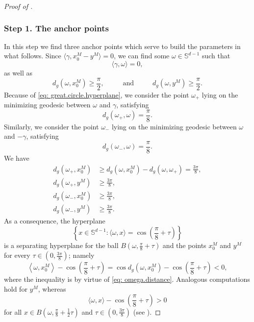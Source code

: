 \documentclass[a4paper,11pt]{article}
\theoremstyle{plain}
\renewcommand{\S}{\mathbb{S}^{d-1}}
\renewcommand{\geq}{\geqslant}
\numberwithin{equation}{section}
\begin{document}
\begin{proof}[Proof of ]
\subsubsection*{Step 1. The anchor points}
In this step we find three anchor points which serve to build the parameters in what follows. 
Since $\langle \gamma, x_0^M-y^M\rangle=0$, we can find some $\omega\in\S$ such that 
\begin{equation}\label{eq: great.circle.hyperplane}
\langle \gamma, \omega\rangle=0,
\end{equation}
as well as
\begin{equation}\label{eq: omega.distance}
d_g\left(\omega, x_0^M\right)\geq \frac{\pi}{2},\hspace{1cm}\text{ and } \hspace{1cm}  d_g\left(\omega, y^M\right)\geq\frac{\pi}{2}.
\end{equation}
Because of \eqref{eq: great.circle.hyperplane}, we consider the point $\omega_+$ lying on the minimizing geodesic between $\omega$ and $\gamma$, satisfying
\begin{equation*}
d_g(\omega_+,\omega)=\frac{\pi}{8}.
\end{equation*}
Similarly, we consider the point $\omega_-$ lying on the minimizing geodesic between $\omega$ and $-\gamma$, satisfying 
\begin{equation*}
d_g(\omega_-,\omega)=\frac{\pi}{8}.
\end{equation*}
We have 
\begin{align*}
d_g\left(\omega_+,x_0^M\right)&\geq d_g\left(\omega,x_0^M\right)-d_g\left(\omega,\omega_+\right)=\frac{3\pi}{8},\\
d_g\left(\omega_+,y^M\right)&\geq \frac{3\pi}{8},\\ 
d_g\left(\omega_-,x_0^M\right)&\geq \frac{3\pi}{8},\\
d_g\left(\omega_-,y^M\right)&\geq \frac{3\pi}{8}.
\end{align*}
As a consequence, the hyperplane 
\begin{equation*}
\left\{x\in\S\colon\langle\omega,x\rangle=\cos\left(\frac{\pi}{8}+\tau\right)\right\}
\end{equation*}
is a separating hyperplane for the ball $B\left(\omega,\frac{\pi}{8}+\tau\right)$ and the points $x_0^M$ and $y^M$ for every $\tau\in(0,\frac{3\pi}{8})$; namely
\begin{equation*}
\left\langle \omega,x_0^M\right\rangle -\cos\left(\frac{\pi}{8}+\tau\right)=\cos d_g\left(\omega,x_0^M\right)-\cos\left(\frac{\pi}{8}+\tau\right)<0,
\end{equation*}
where the inequality is by virtue of \eqref{eq: omega.distance}. 
Analogous computations hold for $y^M$, whereas
\begin{equation*}
\langle\omega,x\rangle -\cos\left(\frac{\pi}{8}+\tau\right)>0
\end{equation*}
for all $x\in B(\omega,\frac{\pi}{8}+\frac{1}{2}\tau)$ and $\tau\in(0,\frac{3\pi}{8})$ (see ).


\end{proof}
\end{document}
